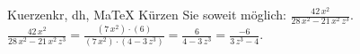\begin{MAufgabe}{Kuerzen}{kr, dh, MaTeX}
K\"urzen Sie soweit m\"oglich: $\frac{42\, x^2}{28\, x^2 - 21\, x^2\, z^3}$.\\ 
\ifLsg\MLoesung
\quad $\frac{42\, x^2}{28\, x^2 - 21\, x^2\, z^3}=\frac{(7\, x^2)\cdot(6)}{(7\, x^2)\cdot(4 - 3\, z^3)}=\frac{6}{4 - 3\, z^3}=\frac{-6}{3\, z^3 - 4}$.\else\relax\fi
 \end{MAufgabe}